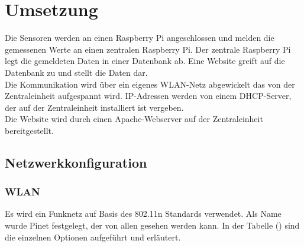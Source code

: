 \chapter{Umsetzung}

Die Sensoren werden an einen Raspberry Pi angeschlossen und melden die
gemessenen Werte an einen zentralen Raspberry Pi. Der zentrale Raspberry Pi legt
die gemeldeten Daten in einer Datenbank ab. Eine Website greift auf die
Datenbank zu und stellt die Daten dar.\\
Die Kommunikation wird über ein eigenes WLAN-Netz abgewickelt das von der
Zentraleinheit aufgespannt wird. IP-Adressen werden von einem DHCP-Server, der
auf der Zentraleinheit installiert ist vergeben.\\
Die Website wird durch einen Apache-Webserver auf der Zentraleinheit
bereitgestellt.

\section{Netzwerkkonfiguration}


\subsection{WLAN}

Es wird ein Funknetz auf Basis des 802.11n Standards verwendet. Als Name wurde
Pinet festgelegt, der von allen gesehen werden kann. In der Tabelle
() sind die einzelnen Optionen
aufgeführt und erläutert.


